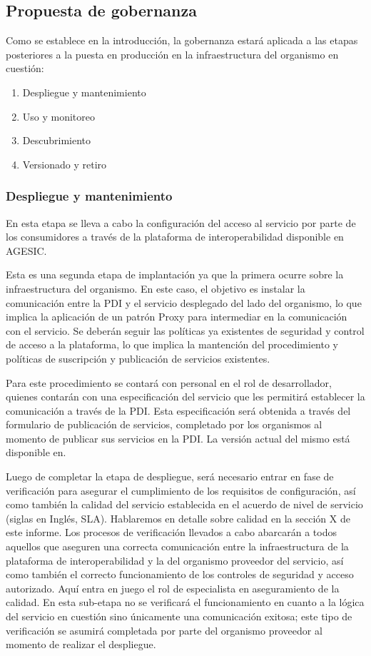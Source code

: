 \documentclass[11pt]{article}
\begin{document}
		\subsection{Propuesta de gobernanza}
			Como se establece en la introducción, la gobernanza estará aplicada a las etapas posteriores a la puesta en producción en la infraestructura del organismo en cuestión:
			\begin{enumerate}
				\item Despliegue y mantenimiento
				\item Uso y monitoreo
				\item Descubrimiento
				\item Versionado y retiro
			\end{enumerate}

			\subsubsection{Despliegue y mantenimiento}
				En esta etapa se lleva a cabo la configuración del acceso al servicio por parte de los consumidores a través de la plataforma de interoperabilidad disponible en AGESIC.

				Esta es una segunda etapa de implantación ya que la primera ocurre sobre la infraestructura del organismo. En este caso, el objetivo es instalar la comunicación entre la PDI y el servicio desplegado del lado del organismo, lo que implica la aplicación de un patrón Proxy para intermediar en la comunicación con el servicio. Se deberán seguir las políticas ya existentes de seguridad y control de acceso a la plataforma, lo que implica la mantención del procedimiento y políticas de suscripción y publicación de servicios existentes.

				Para este procedimiento se contará con personal en el rol de desarrollador, quienes contarán con una especificación del servicio que les permitirá establecer la comunicación a través de la PDI. Esta especificación será obtenida a través del formulario de publicación de servicios, completado por los organismos al momento de publicar sus servicios en la PDI. La versión actual del mismo está disponible en.

				Luego de completar la etapa de despliegue, será necesario entrar en fase de verificación para asegurar el cumplimiento de los requisitos de configuración, así como también la calidad del servicio establecida en el acuerdo de nivel de servicio (siglas en Inglés, SLA). Hablaremos en detalle sobre calidad en la sección X de este informe. Los procesos de verificación llevados a cabo abarcarán a todos aquellos que aseguren una correcta comunicación entre la infraestructura de la plataforma de interoperabilidad y la del organismo proveedor del servicio, así como también el correcto funcionamiento de los controles de seguridad y acceso autorizado. Aquí entra en juego el rol de especialista en aseguramiento de la calidad. En esta sub-etapa no se verificará el funcionamiento en cuanto a la lógica del servicio en cuestión sino únicamente una comunicación exitosa; este tipo de verificación se asumirá completada por parte del organismo proveedor al momento de realizar el despliegue.
\end{document}
